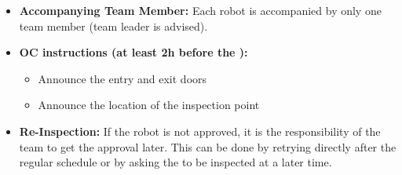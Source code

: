\begin{itemize}
	\item \textbf{Accompanying Team Member:} Each robot is accompanied by only one team member (team leader is advised).
	\item \textbf{OC instructions (at least 2h before the \RobotInspection):}
	\begin{itemize}
		\item Announce the entry and exit doors
		\item Announce the location of the inspection point
	\end{itemize}
	\item \textbf{Re-Inspection:} If the robot is not approved, it is the responsibility of the team to get the approval later. This can be done by retrying directly after the regular \RobotInspection{} schedule or by asking the  to be inspected at a later time.
\end{itemize}


